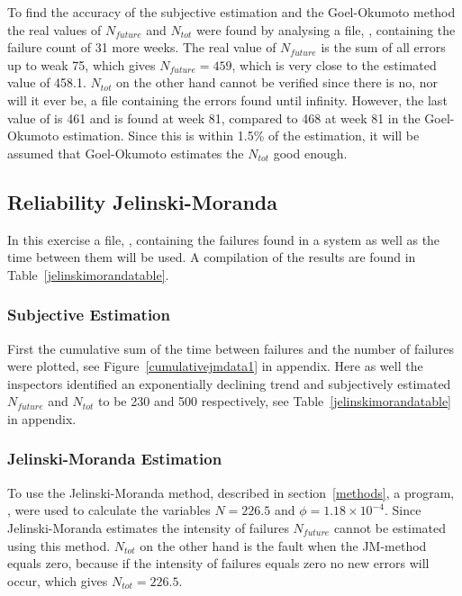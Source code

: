 \label{realdatago}
To find the accuracy of the subjective estimation and the Goel-Okumoto method the real values of $N_{future}$ and $N_{tot}$ were found by analysing a file, , containing the failure count of 31 more weeks. 
The real value of $N_{future}$ is the sum of all errors up to weak 75, which gives $N_{future}=459$, which is very close to the estimated value of 458.1. $N_{tot}$ on the other hand cannot be verified since there is no, nor will it ever be, a file containing the errors found until infinity. However, the last value of  is 461 and is found at week 81, compared to 468 at week 81 in the Goel-Okumoto estimation. Since this is within 1.5\% of the estimation, it will be assumed that Goel-Okumoto estimates the $N_{tot}$ good enough.

\subsection{Reliability Jelinski-Moranda}
In this exercise a file, , containing the failures found in a system as well as the time between them will be used.
A compilation of the results are found in Table~\ref{jelinskimorandatable}.

\subsubsection*{Subjective Estimation} 
First the cumulative sum of the time between failures and the number of failures were plotted, see Figure~\ref{cumulativejmdata1} in appendix. Here as well the inspectors identified an exponentially declining trend and subjectively estimated $N_{future}$ and $N_{tot}$ to be 230 and 500 respectively, see Table~\ref{jelinskimorandatable} in appendix.

\subsubsection*{Jelinski-Moranda Estimation}

To use the Jelinski-Moranda method, described in section~\ref{methods}, a program, , were used to calculate the variables $N=226.5$ and $\phi=1.18\times10^{-4}$. Since Jelinski-Moranda estimates the intensity of failures $N_{future}$ cannot be estimated using this method.
$N_{tot}$ on the other hand is the fault when the JM-method equals zero, because if the intensity of failures equals zero no new errors will occur, which gives $N_{tot}=226.5$.

